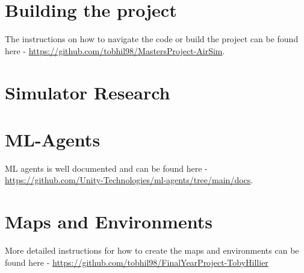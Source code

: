 \section{Building the project}
The instructions on how to navigate the code or build the project can be found here - \url{https://github.com/tobhil98/MastersProject-AirSim}.

\section{Simulator Research} \label{UserGuideSimulatorResearch}


\section{ML-Agents}
ML agents is well documented and can be found here - \url{https://github.com/Unity-Technologies/ml-agents/tree/main/docs}.

\section{Maps and Environments}
More detailed instructions for how to create the maps and environments can be found here - \url{https://github.com/tobhil98/FinalYearProject-TobyHillier}
%



